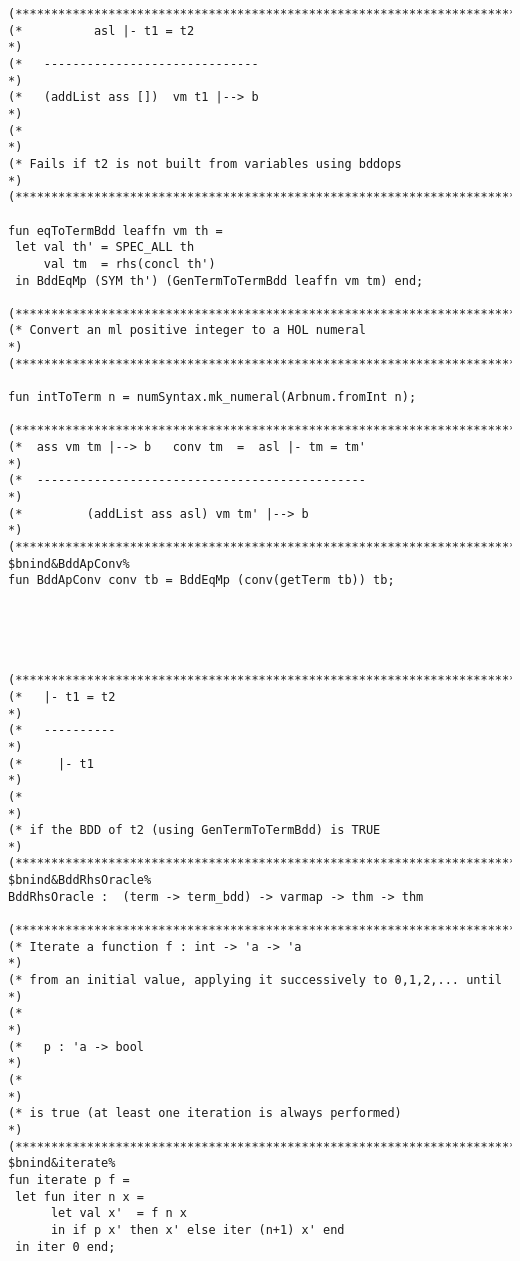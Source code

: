 \documentclass[12pt]{article}
\begin{document}
\begin{footnotesize}
\begin{Verbatim}[commandchars=\$\&\%]
(*****************************************************************************)
(*          asl |- t1 = t2                                                   *)
(*   ------------------------------                                          *)
(*   (addList ass [])  vm t1 |--> b                                          *)
(*                                                                           *)
(* Fails if t2 is not built from variables using bddops                      *)
(*****************************************************************************)

fun eqToTermBdd leaffn vm th =
 let val th' = SPEC_ALL th
     val tm  = rhs(concl th')
 in BddEqMp (SYM th') (GenTermToTermBdd leaffn vm tm) end;

(*****************************************************************************)
(* Convert an ml positive integer to a HOL numeral                           *)
(*****************************************************************************)

fun intToTerm n = numSyntax.mk_numeral(Arbnum.fromInt n);

(*****************************************************************************)
(*  ass vm tm |--> b   conv tm  =  asl |- tm = tm'                           *)
(*  ----------------------------------------------                           *)
(*         (addList ass asl) vm tm' |--> b                                   *)
(*****************************************************************************)
$bnind&BddApConv%
fun BddApConv conv tb = BddEqMp (conv(getTerm tb)) tb;





(*****************************************************************************)
(*   |- t1 = t2                                                              *)
(*   ----------                                                              *)
(*     |- t1                                                                 *)
(*                                                                           *)
(* if the BDD of t2 (using GenTermToTermBdd) is TRUE                         *)
(*****************************************************************************)
$bnind&BddRhsOracle%
BddRhsOracle :  (term -> term_bdd) -> varmap -> thm -> thm

(*****************************************************************************)
(* Iterate a function f : int -> 'a -> 'a                                    *)
(* from an initial value, applying it successively to 0,1,2,... until        *)
(*                                                                           *)
(*   p : 'a -> bool                                                          *)
(*                                                                           *)
(* is true (at least one iteration is always performed)                      *)
(*****************************************************************************)
$bnind&iterate%
fun iterate p f =
 let fun iter n x =
      let val x'  = f n x
      in if p x' then x' else iter (n+1) x' end
 in iter 0 end;


\end{Verbatim}
\end{footnotesize}
\end{document}
